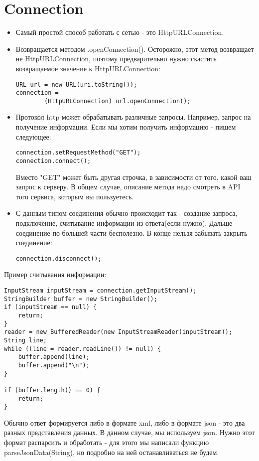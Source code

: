 \documentclass[12 pt]{article}
\begin{document}
\section{Connection}
    \begin{itemize}
        \item Самый простой способ работать с сетью - это HttpURLConnection.
        \item Возвращается методом .openConnection(). Осторожно, этот метод возвращает не HttpURLConnection, поэтому предварительно нужно скастить возвращаемое значение к HttpURLConnection:
        \begin{lstlisting}
URL url = new URL(uri.toString());
connection = 
        (HttpURLConnection) url.openConnection();
        \end{lstlisting}
        \item Протокол http может обрабатывать различные запросы. Например, запрос на получение информации. Если мы хотим получить информацию - пишем следующее:
        \begin{lstlisting}
connection.setRequestMethod("GET");
connection.connect();
        \end{lstlisting} Вместо "GET" может быть другая строчка, в зависимости от того, какой ваш запрос к серверу. В общем случае, описание метода надо смотреть в API того сервиса, которым вы пользуетесь. 
        \item С данным типом соединения обычно происходит так - создание запроса, подключение, считывание информации из ответа(если нужно). Дальше соединение по большей части бесполезно. В конце нельзя забывать закрыть соединение: 
        \begin{lstlisting}
connection.disconnect();        
        \end{lstlisting}
    \end{itemize}
    Пример считывания информации:
    \begin{lstlisting}
InputStream inputStream = connection.getInputStream();
StringBuilder buffer = new StringBuilder();
if (inputStream == null) {
    return;
}
reader = new BufferedReader(new InputStreamReader(inputStream));
String line;
while ((line = reader.readLine()) != null) {
    buffer.append(line);
    buffer.append("\n");
}

if (buffer.length() == 0) {
    return;
}
    \end{lstlisting}
    Обычно ответ формируется либо в формате xml, либо в формате json - это два разных представления данных. В данном случае, мы используем json. Нужно этот формат распарсить и обработать - для этого мы написали функцию parseJsonData(String), но подробно на ней останавливаться не будем.
    
\end{document}
